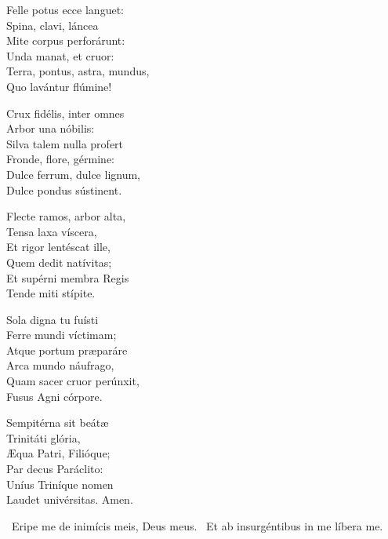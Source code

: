 Felle potus ecce languet:\\
Spina, clavi, láncea\\
Mite corpus perforárunt:\\
Unda manat, et cruor:\\
Terra, pontus, astra, mundus,\\
Quo lavántur flúmine!

Crux fidélis, inter omnes\\
Arbor una nóbilis:\\
Silva talem nulla profert\\
Fronde, flore, gérmine:\\
Dulce ferrum, dulce lignum,\\
Dulce pondus sústinent.

Flecte ramos, arbor alta,\\
Tensa laxa víscera,\\
Et rigor lentéscat ille,\\
Quem dedit natívitas;\\
Et supérni membra Regis\\
Tende miti stípite.

Sola digna tu fuísti\\
Ferre mundi víctimam;\\
Atque portum præparáre\\
Arca mundo náufrago,\\
Quam sacer cruor perúnxit,\\
Fusus Agni córpore.

Sempitérna sit beátæ\\
Trinitáti glória,\\
Æqua Patri, Filióque;\\
Par decus Paráclito:\\
Uníus Triníque nomen\\
Laudet univérsitas. Amen.

\V\ Eripe me de inimícis meis, Deus meus. \R\ Et ab insurgéntibus in me líbera me.




\sectionornament


